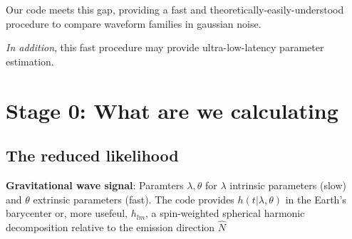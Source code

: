 \documentclass[twocolumn,prd,nofootinbib]{revtex4}
\begin{document}
Our code meets this gap, providing a fast and theoretically-easily-understood procedure to compare waveform families in
gaussian noise.  

\emph{In addition}, this fast procedure may provide ultra-low-latency parameter estimation.

\section{Stage 0: What are we calculating}

\subsection{The reduced likelihood}
\noindent \textbf{Gravitational wave signal}: Paramters $\lambda,\theta$ for $\lambda$ intrinsic parameters (slow) and
$\theta$ extrinsic parameters (fast).  The code provides $h(t|\lambda,\theta)$ in the Earth's barycenter or, more
usefeul, $h_{lm}$, a spin-weighted spherical harmonic decomposition relative to the emission direction $\hat{N}$
\end{document}
